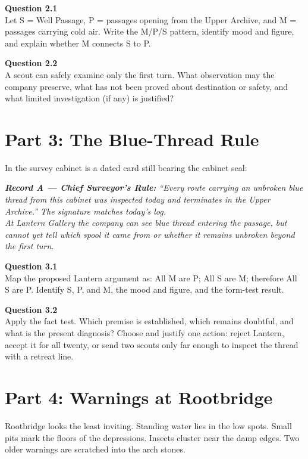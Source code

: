 \documentclass[12pt]{article}
\newcommand{\cluebox}[1]{\par\vspace{0.12em}\noindent\begin{minipage}{\textwidth}\itshape #1\end{minipage}\par\vspace{0.12em}}
\begin{document}
\textbf{Question 2.1}\\[-0.15em]
Let S = Well Passage, P = passages opening from the Upper Archive, and M = passages carrying cold air. Write the M/P/S pattern, identify mood and figure, and explain whether M connects S to P.

\textbf{Question 2.2}\\[-0.15em]
A scout can safely examine only the first turn. What observation may the company preserve, what has not been proved about destination or safety, and what limited investigation (if any) is justified?

\newpage
\section*{Part 3: The Blue-Thread Rule}
In the survey cabinet is a dated card still bearing the cabinet seal:

\cluebox{\textbf{Record A --- Chief Surveyor's Rule:} ``Every route carrying an unbroken blue thread from this cabinet was inspected today and terminates in the Upper Archive.'' The signature matches today's log.\\[0.25em]
At Lantern Gallery the company can see blue thread entering the passage, but cannot yet tell which spool it came from or whether it remains unbroken beyond the first turn.}

\textbf{Question 3.1}\\[-0.15em]
Map the proposed Lantern argument as: All M are P; All S are M; therefore All S are P. Identify S, P, and M, the mood and figure, and the form-test result.

\textbf{Question 3.2}\\[-0.15em]
Apply the fact test. Which premise is established, which remains doubtful, and what is the present diagnosis? Choose and justify one action: reject Lantern, accept it for all twenty, or send two scouts only far enough to inspect the thread with a retreat line.

\newpage
\section*{Part 4: Warnings at Rootbridge}
Rootbridge looks the least inviting. Standing water lies in the low spots. Small pits mark the floors of the depressions. Insects cluster near the damp edges. Two older warnings are scratched into the arch stones.
\end{document}
